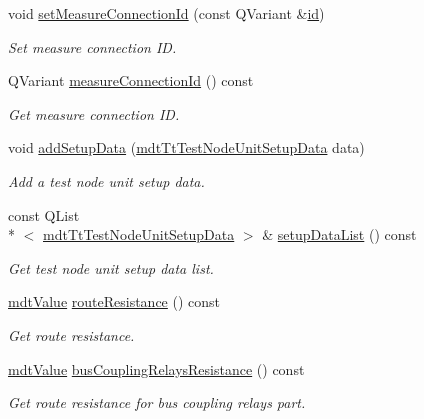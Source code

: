 \begin{DoxyCompactItemize}
void \hyperlink{classmdt_tt_test_model_item_route_data_ad7de5db4f37be0695a4bb02c49f827e3}{set\-Measure\-Connection\-Id} (const Q\-Variant \&\hyperlink{classmdt_tt_test_model_item_route_data_ad34638a6361e64a867f30821b73ff385}{id})
\begin{DoxyCompactList}\small\item\em Set measure connection I\-D. \end{DoxyCompactList}\item 
Q\-Variant \hyperlink{classmdt_tt_test_model_item_route_data_ad1cd545385747807beb563ef5042ecf4}{measure\-Connection\-Id} () const 
\begin{DoxyCompactList}\small\item\em Get measure connection I\-D. \end{DoxyCompactList}\item 
void \hyperlink{classmdt_tt_test_model_item_route_data_a873670487c1ac332593754eed39a4633}{add\-Setup\-Data} (\hyperlink{classmdt_tt_test_node_unit_setup_data}{mdt\-Tt\-Test\-Node\-Unit\-Setup\-Data} data)
\begin{DoxyCompactList}\small\item\em Add a test node unit setup data. \end{DoxyCompactList}\item 
const Q\-List\\*
$<$ \hyperlink{classmdt_tt_test_node_unit_setup_data}{mdt\-Tt\-Test\-Node\-Unit\-Setup\-Data} $>$ \& \hyperlink{classmdt_tt_test_model_item_route_data_aa12fbb1f86b06f2e5cef94e44765f970}{setup\-Data\-List} () const 
\begin{DoxyCompactList}\small\item\em Get test node unit setup data list. \end{DoxyCompactList}\item 
\hyperlink{classmdt_value}{mdt\-Value} \hyperlink{classmdt_tt_test_model_item_route_data_a6407d3d1bbac9abc3c36a0b43c51c47d}{route\-Resistance} () const 
\begin{DoxyCompactList}\small\item\em Get route resistance. \end{DoxyCompactList}\item 
\hyperlink{classmdt_value}{mdt\-Value} \hyperlink{classmdt_tt_test_model_item_route_data_ae11206cb9efa48fde9f29bc7e4d0872c}{bus\-Coupling\-Relays\-Resistance} () const 
\begin{DoxyCompactList}\small\item\em Get route resistance for bus coupling relays part. \end{DoxyCompactList}\item 

\end{DoxyCompactItemize}
